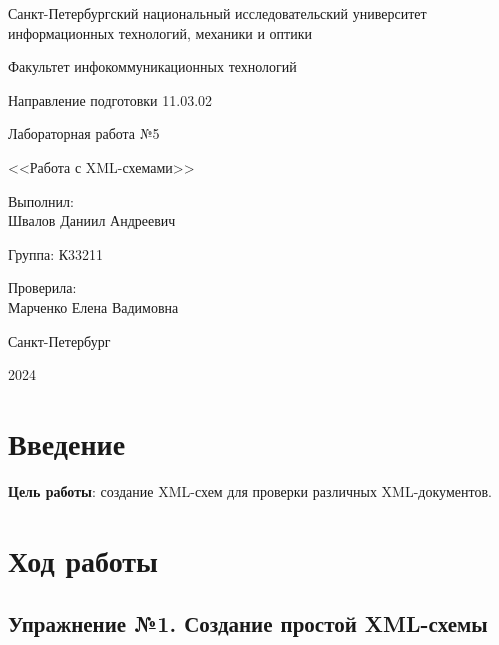 \documentclass[a4paper, 14pt]{extarticle}
\begin{document}
\begin{titlepage}
  \vspace{0pt plus2fill}
  \noindent

  \vspace{0pt plus6fill}
  \begin{center}
    Санкт-Петербургский национальный исследовательский университет
    информационных технологий, механики и оптики

    \vspace{0pt plus3fill}

    Факультет инфокоммуникационных технологий

    Направление подготовки 11.03.02

    \vspace{0pt plus2fill}

    Лабораторная работа №5

    <<Работа с XML-схемами>>

  \end{center}

  \vspace{0pt plus6fill}
  \begin{flushright}
    Выполнил: \\
    Швалов Даниил Андреевич

    Группа: К33211

    Проверила: \\
    Марченко Елена Вадимовна
  \end{flushright}

  \vspace{0pt plus5fill}
  \begin{center}
    Санкт-Петербург

    2024
  \end{center}
\end{titlepage}

\section{Введение}

\textbf{Цель работы}: создание XML-схем для проверки различных XML-документов.

\section{Ход работы}

\subsection*{Упражнение №1. Создание простой XML-схемы}
\end{document}
